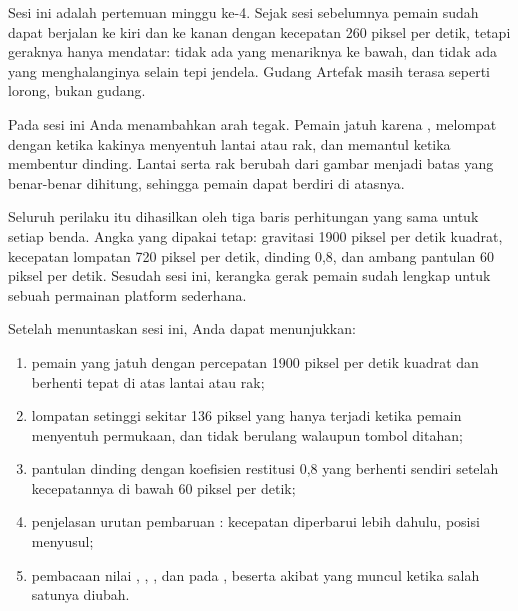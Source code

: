 

Sesi ini adalah pertemuan minggu ke-4. Sejak sesi sebelumnya pemain sudah
dapat berjalan ke kiri dan ke kanan dengan kecepatan 260 piksel per detik,
tetapi geraknya hanya mendatar: tidak ada yang menariknya ke bawah, dan tidak
ada yang menghalanginya selain tepi jendela. Gudang Artefak masih terasa
seperti lorong, bukan gudang.

Pada sesi ini Anda menambahkan arah tegak. Pemain jatuh karena
, melompat dengan  ketika kakinya
menyentuh lantai atau rak, dan memantul ketika membentur dinding. Lantai serta
rak berubah dari gambar menjadi batas yang benar-benar dihitung, sehingga
pemain dapat berdiri di atasnya.

Seluruh perilaku itu dihasilkan oleh tiga baris perhitungan yang sama untuk
setiap benda. Angka yang dipakai tetap: gravitasi 1900 piksel per detik
kuadrat, kecepatan lompatan 720 piksel per detik,  dinding 0,8, dan ambang pantulan 60 piksel per detik. Sesudah sesi
ini, kerangka gerak pemain sudah lengkap untuk sebuah permainan platform
sederhana.


\begin{tujuanbox}
Setelah menuntaskan sesi ini, Anda dapat menunjukkan:
\begin{enumerate}[leftmargin=1.5em, itemsep=0.2em]
  \item pemain yang jatuh dengan percepatan 1900 piksel per detik kuadrat dan
        berhenti tepat di atas lantai atau rak;
  \item lompatan setinggi sekitar 136 piksel yang hanya terjadi ketika pemain
        menyentuh permukaan, dan tidak berulang walaupun tombol ditahan;
  \item pantulan dinding dengan koefisien restitusi 0,8 yang berhenti sendiri
        setelah kecepatannya di bawah 60 piksel per detik;
  \item penjelasan urutan pembaruan : kecepatan
        diperbarui lebih dahulu, posisi menyusul;
  \item pembacaan nilai , ,
        , dan  pada
        , beserta akibat yang muncul ketika salah satunya
        diubah.
\end{enumerate}
\end{tujuanbox}

